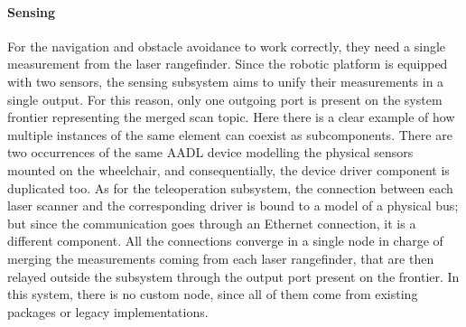 \paragraph{Sensing} For the navigation and obstacle avoidance to work correctly, they need a single measurement from the laser rangefinder. Since the robotic platform is equipped with two sensors, the sensing subsystem aims to unify their measurements in a single output. For this reason, only one outgoing port is present on the system frontier representing the merged scan topic. Here there is a clear example of how multiple instances of the same element can coexist as subcomponents. There are two occurrences of the same AADL device modelling the physical sensors mounted on the wheelchair, and consequentially, the device driver component is duplicated too. As for the teleoperation subsystem, the connection between each laser scanner and the corresponding driver is bound to a model of a physical bus; but since the communication goes through an Ethernet connection, it is a different component. All the connections converge in a single node in charge of merging the measurements coming from each laser rangefinder, that are then relayed outside the subsystem through the output port present on the frontier. In this system, there is no custom node, since all of them come from existing packages or legacy implementations.

